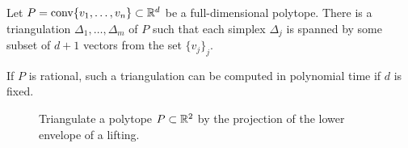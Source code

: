 \begin{theorem}
  \label{thm:polytope-triangulation}
  Let $P = \operatorname{conv}\{ v_1, \ldots, v_n \} \subset \mathbb{R}^d$ be a full-dimensional polytope.
  There is a triangulation $\Delta_1, \ldots, \Delta_m$ of $P$
  such that each simplex $\Delta_j$ is spanned by some subset of $d+1$ vectors from the set $\{ v_j \}_j$.

  If $P$ is rational, such a triangulation can be computed in polynomial time if $d$ is fixed.
\end{theorem}
\begin{figure}
  \begin{center}
  \end{center}
  \caption{Triangulate a polytope $P \subset \mathbb{R}^2$ by the projection of the lower envelope of a lifting.}
  \label{fig:triangulation-proof}
\end{figure}
